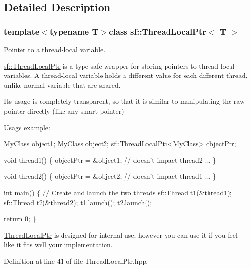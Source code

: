 \subsection{Detailed Description}
\subsubsection*{template$<$typename T$>$class sf\-::\-Thread\-Local\-Ptr$<$ T $>$}

Pointer to a thread-\/local variable. 

\hyperlink{classsf_1_1ThreadLocalPtr}{sf\-::\-Thread\-Local\-Ptr} is a type-\/safe wrapper for storing pointers to thread-\/local variables. A thread-\/local variable holds a different value for each different thread, unlike normal variable that are shared.

Its usage is completely transparent, so that it is similar to manipulating the raw pointer directly (like any smart pointer).

Usage example\-: 
\begin{DoxyCode}
MyClass object1;
MyClass object2;
\hyperlink{classsf_1_1ThreadLocalPtr}{sf::ThreadLocalPtr<MyClass>} objectPtr;

\textcolor{keywordtype}{void} thread1()
\{
    objectPtr = &object1; \textcolor{comment}{// doesn't impact thread2}
    ...
\}

\textcolor{keywordtype}{void} thread2()
\{
    objectPtr = &object2; \textcolor{comment}{// doesn't impact thread1}
    ...
\}

\textcolor{keywordtype}{int} main()
\{
    \textcolor{comment}{// Create and launch the two threads}
    \hyperlink{classsf_1_1Thread}{sf::Thread} t1(&thread1);
    \hyperlink{classsf_1_1Thread}{sf::Thread} t2(&thread2);
    t1.launch();
    t2.launch();

    \textcolor{keywordflow}{return} 0;
\}
\end{DoxyCode}


\hyperlink{classsf_1_1ThreadLocalPtr}{Thread\-Local\-Ptr} is designed for internal use; however you can use it if you feel like it fits well your implementation. 

Definition at line 41 of file Thread\-Local\-Ptr.\-hpp.



